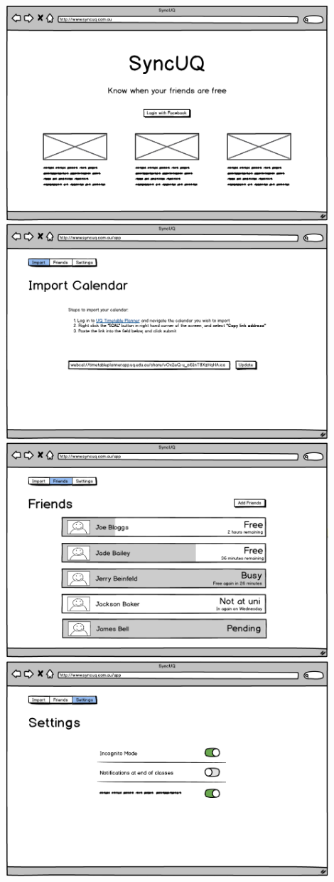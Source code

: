 \documentclass[8pt,a4paper]{report}
\begin{document}
\centering
\includegraphics[width=0.9\textwidth]{Homepage.png}
\medskip
\centering
\medskip
\includegraphics[width=0.9\textwidth]{Import.png}
\medskip
\centering
\includegraphics[width=0.9\textwidth]{Friends.png}
\medskip
\centering
\includegraphics[width=0.9\textwidth]{Settings.png}
\end{document}
